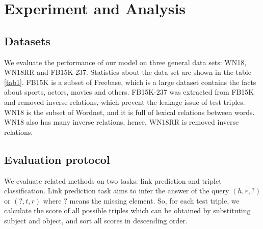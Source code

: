 \documentclass[letterpaper]{article} \usepackage{aaai20}  \usepackage{times}  \usepackage{helvet} \usepackage{courier}  \usepackage[hyphens]{url}  \usepackage{graphicx} \usepackage{lineno,hyperref,amsmath,amssymb}
\begin{document}
\section{Experiment and Analysis}

\subsection{Datasets}
We evaluate the performance of our model on three general data sets: WN18, WN18RR and FB15K-237. Statistics about the data set are shown in the table \ref{tab1}. FB15K\cite{bordes2013translating} is a subset of Freebase, which is a large dataset contains the facts about sports, actors, movies and others. FB15K-237\cite{toutanova2015observed} was extracted from FB15K and removed inverse relations, which prevent the leakage issue of test triples. WN18\cite{bordes2013translating} is the subset of Wordnet, and it is full of lexical relations between words. WN18 also has many inverse relations, hence, WN18RR\cite{dettmers2018convolutional} is removed inverse relations.

\begin{table}[h]
\centering
{}
\caption{\textbf{statistics about the experimental datasets.}}
\label{tab1}
\end{table}

\subsection{Evaluation protocol}

We evaluate related methods on two tasks: link prediction and triplet classification. Link prediction task aims to infer the answer of the query $(h,r,?)$ or $(?,t,r)$ where $?$ means the missing element. So, for each test triple, we calculate the score of all possible triples which can be obtained by substituting subject and object, and sort all scores in descending order.
\end{document}
